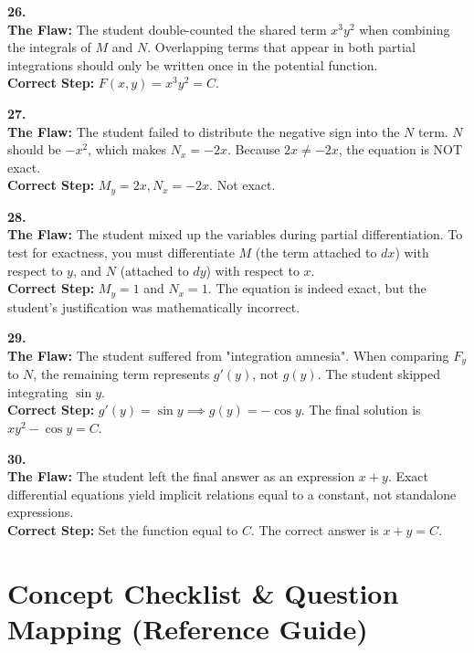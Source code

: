 \documentclass[11pt]{article}
\begin{document}
\textbf{26.} \\
\textbf{The Flaw:} The student double-counted the shared term $x^3 y^2$ when combining the integrals of $M$ and $N$. Overlapping terms that appear in both partial integrations should only be written once in the potential function. \\
\textbf{Correct Step:} $F(x,y) = x^3 y^2 = C$.

\textbf{27.} \\
\textbf{The Flaw:} The student failed to distribute the negative sign into the $N$ term. $N$ should be $-x^2$, which makes $N_x = -2x$. Because $2x \neq -2x$, the equation is NOT exact. \\
\textbf{Correct Step:} $M_y = 2x, N_x = -2x$. Not exact.

\textbf{28.} \\
\textbf{The Flaw:} The student mixed up the variables during partial differentiation. To test for exactness, you must differentiate $M$ (the term attached to $dx$) with respect to $y$, and $N$ (attached to $dy$) with respect to $x$. \\
\textbf{Correct Step:} $M_y = 1$ and $N_x = 1$. The equation is indeed exact, but the student's justification was mathematically incorrect.

\textbf{29.} \\
\textbf{The Flaw:} The student suffered from "integration amnesia". When comparing $F_y$ to $N$, the remaining term represents $g'(y)$, not $g(y)$. The student skipped integrating $\sin y$. \\
\textbf{Correct Step:} $g'(y) = \sin y \implies g(y) = -\cos y$. The final solution is $xy^2 - \cos y = C$.

\textbf{30.} \\
\textbf{The Flaw:} The student left the final answer as an expression $x+y$. Exact differential equations yield implicit relations equal to a constant, not standalone expressions. \\
\textbf{Correct Step:} Set the function equal to $C$. The correct answer is $x + y = C$.

\newpage
\section{Concept Checklist \& Question Mapping (Reference Guide)}
\end{document}
